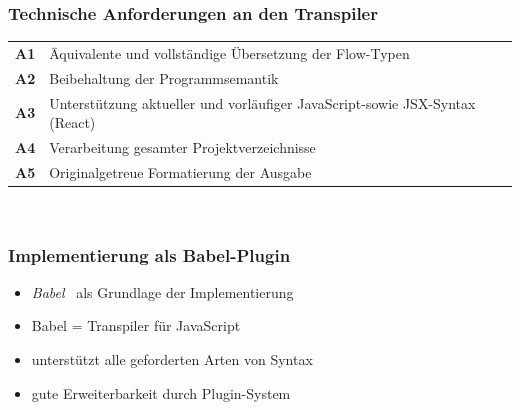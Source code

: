     \begin{frame}
      \frametitle{Technische Anforderungen an den Transpiler}
      {
        \renewcommand{\arraystretch}{1.4}
        \begin{tabu} to 
          \textbf{A1} & Äquivalente und vollständige Übersetzung der Flow-Typen \\
          \textbf{A2} & Beibehaltung der Programmsemantik \\
          \textbf{A3} & Unterstützung aktueller und vorläufiger\footnotemark{} JavaScript-\newline sowie JSX-Syntax (React) \\
          \textbf{A4} & Verarbeitung gesamter Projektverzeichnisse \\
          \textbf{A5} & Originalgetreue Formatierung der Ausgabe \\
        \end{tabu}
        \\[0.75em]
      }

    \end{frame}


    \begin{frame}
      \frametitle{Implementierung als Babel-Plugin}
      \begin{itemize}
        \item \textit{Babel}~\autocite{BABEL} als Grundlage der Implementierung
        \item Babel = Transpiler für JavaScript
        \item unterstützt alle geforderten Arten von Syntax
        \item gute Erweiterbarkeit durch Plugin-System
      \end{itemize}
    \end{frame}

